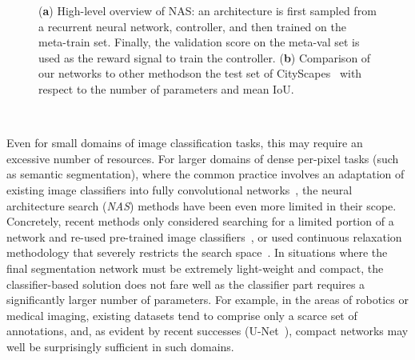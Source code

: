 \documentclass[10pt,twocolumn,letterpaper]{article}
\begin{document}
\begin{figure}[t]
	\hfill
	\hfill
	\caption{({\bf a}) High-level overview of NAS: an architecture is first sampled from a recurrent neural network, controller, and then trained on the meta-train set. Finally, the validation score on the meta-val set is used as the reward signal to train the controller.
		({\bf b}) Comparison of our networks to other methods\protect\footnotemark on the test set of CityScapes~\cite{CordtsORREBFRS16} with respect to the number of parameters and mean IoU.\label{fig:main}}
\end{figure}

~



Even for small domains of image classification tasks, this may require an excessive number of resources. For larger domains of dense per-pixel tasks (such as semantic segmentation), where the common practice involves an adaptation of existing image classifiers into fully convolutional networks~\cite{LongSD15}, the neural architecture search ({\em NAS}) methods have been even more limited in their scope. Concretely, recent methods only considered searching for a limited portion of a network and re-used pre-trained image classifiers~\cite{abs-1809-04184,abs-1810-10804}, or used continuous relaxation methodology that severely restricts the search space~\cite{abs-1901-02985}. In situations where the final segmentation network must be extremely light-weight and compact, the classifier-based solution does not fare well as the classifier part requires a significantly larger number of parameters. For example, in the areas of robotics or medical imaging, existing datasets tend to comprise only a scarce set of annotations, and, as evident by recent successes (\eg U-Net~\cite{RonnebergerFB15}), compact networks may well be surprisingly sufficient in such domains.
\end{document}
